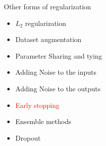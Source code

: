 \begin{frame}
\end{frame}

\begin{frame}
	\vspace{4em}
	\begin{overlayarea}{\textwidth}{\textheight}
		\begin{block}{Other forms of regularization}
			\begin{itemize}
				\item $L_2$ regularization
				\item Dataset augmentation
				\item Parameter Sharing and tying
				\item Adding Noise to the inputs
				\item Adding Noise to the outputs 
				\item \textcolor<2->{red}{Early stopping}
				\item Ensemble methods
				\item Dropout
			\end{itemize}
		\end{block}
	\end{overlayarea}
\end{frame}


